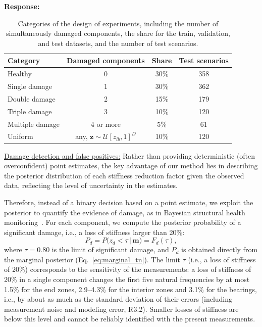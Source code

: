 \documentclass[11pt]{article}
\newenvironment{response}{\par\smallskip\noindent\color{resp}\textbf{Response:}\ }{\par}
\newcommand{\m}{\mathbf{m}}
\newcommand{\z}{\mathbf{z}}
\begin{document}
\begin{response}
\begin{table}[H]
\centering\small
\caption{Categories of the design of experiments, including the number of simultaneously damaged components, the share for the train, validation, and test datasets, and the number of test scenarios.
}
\label{tab:doe}
\begin{tabular}{lccc}
\toprule
Category & Damaged components & Share & Test scenarios \\
\midrule
Healthy & 0 & 30\% & 358 \\
Single damage & 1 & 30\% & 362 \\
Double damage & 2 & 15\% & 179 \\
Triple damage & 3 & 10\% & 120 \\
Multiple damage & 4 or more & 5\% & 61 \\
Uniform & any, $\z\sim\mathcal{U}[z_{lb},1]^D$ & 10\% & 120 \\
\bottomrule
\end{tabular}
\end{table}

\underline{Damage detection and false positives:} Rather than providing deterministic  (often overconfident) point estimates, the key advantage of our method lies in describing the posterior distribution of each stiffness reduction factor given the observed data, reflecting the level of uncertainty in the estimates.   

Therefore, instead of a binary decision based on a point estimate, we exploit the posterior to quantify the evidence of damage, as in Bayesian structural health monitoring~\cite{vanik2000bayesian}.
For each component, we compute the posterior probability of a significant damage, i.e., a loss of stiffness larger than 20\%:
\begin{equation}
	P_d=P\big(z_d<\tau\,|\,\m\big)=F_d(\tau),
	\label{eq:pd}
\end{equation}
where $\tau=0.80$ is the limit of significant damage, and $P_d$ is obtained directly from the marginal posterior (Eq.~\eqref{eq:marginal_tn}).
The limit $\tau$ (i.e., a loss of stiffness of 20\%) corresponds to the sensitivity of the measurements: a loss of stiffness of 20\% in a single component changes the first five natural frequencies by at most 1.5\% for the end zones, 2.9--4.3\% for the interior zones and 3.1\% for the bearings, i.e., by about as much as the standard deviation of their errors (including measurement noise and modeling error, R3.2).
Smaller losses of stiffness are below this level and cannot be reliably identified with the present measurements.


\end{response}
\end{document}
